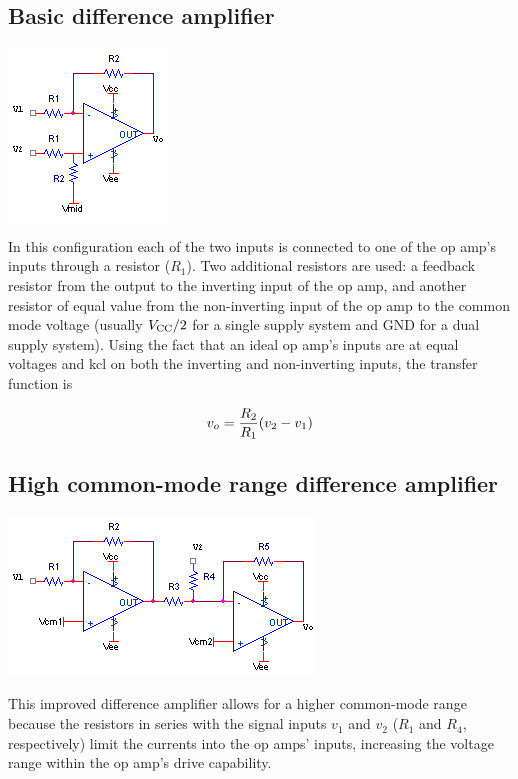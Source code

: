 \subsection{Basic difference amplifier}
\begin{center}
	\includegraphics{schematics/differenceamp.PNG}
\end{center}
In this configuration each of the two inputs is connected to one of the op amp's inputs through a resistor ($R_1$).
Two additional resistors are used:
a feedback resistor from the output to the inverting input of the op amp, and another resistor of equal value from the non-inverting input of the op amp to the common mode voltage (usually $V_\mathrm{CC}/2$ for a single supply system and GND for a dual supply system).
Using the fact that an ideal op amp's inputs are at equal voltages and \ac{kcl} on both the inverting and non-inverting inputs, the transfer function is

\textcolor{red}{
\begin{equation}
v_o = \frac{R_2}{R_1}(v_2-v_1)
\label{eq:differenceamp}
\end{equation}
}

\subsection{High common-mode range difference amplifier}
\begin{center}
	\includegraphics{schematics/highcmdifferenceamplifier.PNG}
\end{center}
This improved difference amplifier allows for a higher common-mode range because the resistors in series with the signal inputs $v_1$ and $v_2$ ($R_1$ and $R_4$, respectively) limit the currents into the op amps' inputs, increasing the voltage range within the op amp's drive capability. \autocite[418]{op-amps-for-everyone}

